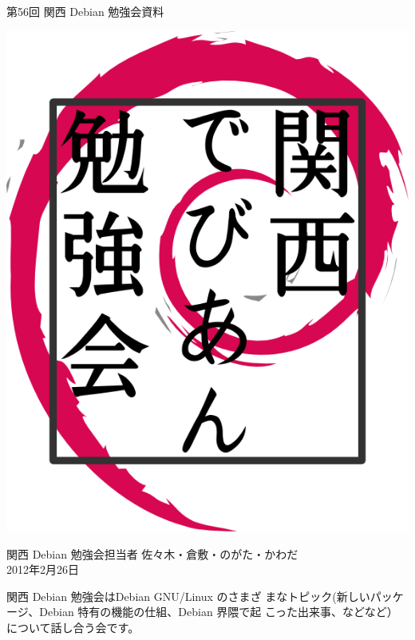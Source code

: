 \documentclass[mingoth,a4paper]{jsarticle}
\newcommand{\debmtgyear}{2012}
\newcommand{\debmtgdate}{26}
\newcommand{\debmtgmonth}{2}
\newcommand{\debmtgnumber}{56}
\begin{document}
\begin{titlepage}


 第\debmtgnumber{}回 関西 Debian 勉強会資料

\vspace{2cm}

\begin{center}
\includegraphics{image200802/kansaidebianlogo.png}
\end{center}

\begin{flushright}
\hfill{}関西 Debian 勉強会担当者 佐々木・倉敷・のがた・かわだ \\
\hfill{}\debmtgyear{}年\debmtgmonth{}月\debmtgdate{}日
\end{flushright}

\thispagestyle{empty}
\end{titlepage}


 関西 Debian 勉強会はDebian GNU/Linux のさまざ
 まなトピック(新しいパッケージ、Debian 特有の機能の仕組、Debian 界隈で起
 こった出来事、などなど）について話し合う会です。
\end{document}

